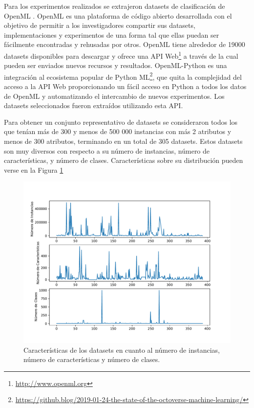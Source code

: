 Para los experimentos realizados se extrajeron datasets de clasificación de OpenML \cite{vanschoren2014openml}. OpenML es una plataforma de código abierto desarrollada con el objetivo de permitir a los investigadores compartir sus datasets, implementaciones y experimentos de una forma tal que ellas puedan ser fácilmente encontradas y rehusadas por otros. OpenML tiene alrededor de 19000 datasets disponibles para descargar y ofrece una API Web\footnote{\url{http://www.openml.org}} a través de la cual pueden ser enviados nuevos recursos y resultados. OpenML-Python \cite{feurer2019openmlpy} es una integración al ecosistema popular de Python ML\footnote{\url{https://github.blog/2019-01-24-the-state-of-the-octoverse-machine-learning/}}, que quita la complejidad del acceso a la API Web proporcionando un fácil acceso en Python a todos los datos de OpenML y automatizando el intercambio de nuevos experimentos. Los datasets seleccionados fueron extraídos utilizando esta API.
 
 Para obtener un conjunto representativo de datasets se consideraron todos los que tenían más de 300  y menos de 500 000 instancias con más 2 atributos y menos de 300 atributos, terminando en un total de 305 datasets. Estos datasets son muy diversos con respecto a su número de instancias, número de características, y número de clases. Características sobre su distribución pueden verse en la Figura \ref{fig:datasets}
 
 \begin{figure}[H]
\centering
\includegraphics[scale=.75]{Figures/mtf-lineplot.pdf}
\caption{Características de los datasets en cuanto al número de instancias, número de características y número de clases.}
\label{fig:datasets}
\end{figure}
 
